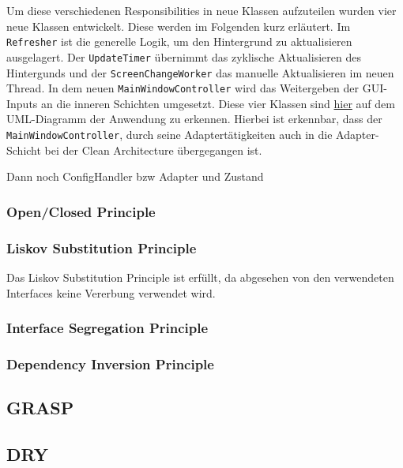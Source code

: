Um diese verschiedenen Responsibilities in neue Klassen aufzuteilen wurden vier neue Klassen entwickelt. Diese werden im Folgenden kurz erläutert. Im \texttt{Refresher} ist die generelle Logik, um den Hintergrund zu aktualisieren ausgelagert. Der \texttt{UpdateTimer} übernimmt das zyklische Aktualisieren des Hintergunds und der \texttt{ScreenChangeWorker} das manuelle Aktualisieren im neuen Thread. In dem neuen \texttt{MainWindowController} wird das Weitergeben der GUI-Inputs an die inneren Schichten umgesetzt. Diese vier Klassen sind \href{https://github.com/Bronzila/WeatherWallpaper/blob/master/CleanArchitecturePics/Architektur_Vorher.jpg}{\color{blue}hier} auf dem UML-Diagramm der Anwendung zu erkennen. Hierbei ist erkennbar, dass der \texttt{MainWindowController}, durch seine Adaptertätigkeiten auch in die Adapter-Schicht bei der Clean Architecture übergegangen ist.

Dann noch ConfigHandler bzw Adapter und Zustand
\subsubsection{Open/Closed Principle}

\subsubsection{Liskov Substitution Principle}
Das Liskov Substitution Principle ist erfüllt, da abgesehen von den verwendeten Interfaces keine Vererbung verwendet wird.
\subsubsection{Interface Segregation Principle}

\subsubsection{Dependency Inversion Principle}

\subsection{GRASP}

\subsection{DRY}
